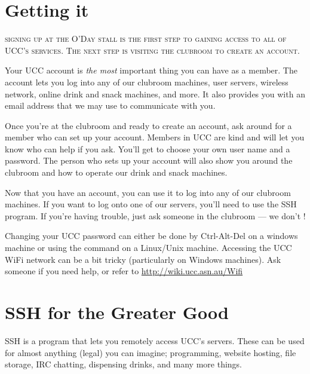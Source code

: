 \label{SetupAccount}



\section{Getting it}

\textsc{signing up at the O'Day stall is the first step to gaining access to all of UCC's services. The next step is visiting the clubroom to create an account.}

Your UCC account is \emph{the most} important thing you can have as a member.
The account lets you log into any of our clubroom machines, user servers, wireless network, online drink and snack machines, and more.
It also provides you with an email address that we may use to communicate with you.

Once you're at the clubroom and ready to create an account, ask around for a member who can set up your account. Members in UCC are kind and will let you know who can help if you ask. You'll get to choose your own user name and a password. The person who sets up your account will also show you around the clubroom and how to operate our drink and snack machines.

Now that you have an account, you can use it to log into any of our clubroom machines. If you want to log onto one of our servers, you'll need to use the SSH program. If you're having trouble, just ask someone in the clubroom --- we don't !

Changing your UCC password can either be done by Ctrl-Alt-Del on a windows machine or using the command  on a Linux/Unix machine.
Accessing the UCC WiFi network can be a bit tricky (particularly on Windows machines). Ask someone if you need help, or refer to \url{http://wiki.ucc.asn.au/Wifi}




\section{SSH for the Greater Good}

SSH is a program that lets you remotely access UCC's servers. These can be used for almost anything (legal) you can imagine; programming, website hosting, file storage, IRC chatting, dispensing drinks, and many more things.

